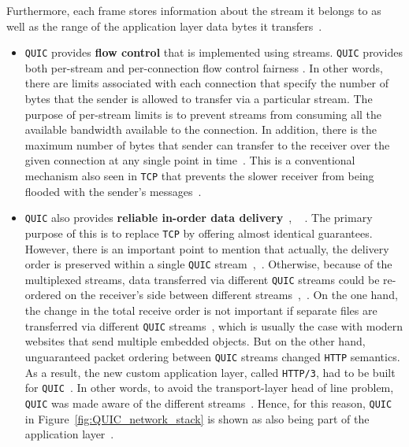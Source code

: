 \documentclass[12pt,a4paper]{report}
\begin{document}
  Furthermore, each frame stores information about the stream it belongs to as well as the range of the application layer data bytes it transfers~\cite{UnderstandQUIC}.
  \begin{itemize}
  
  
  \item \texttt{QUIC} provides \textbf{flow control} that is implemented using streams.
  \texttt{QUIC} provides both per-stream and per-connection flow control fairness \cite{ietf-quic-transport-draft-32}.
  In other words, there are limits associated with each connection that specify the number of bytes that the sender is allowed to transfer via a particular stream.
  The purpose of per-stream limits is to prevent streams from consuming all the available bandwidth available to the connection.
  In addition, there is the maximum number of bytes that sender can transfer to the receiver over the given connection at any single point in time~\cite{ietf-quic-transport-draft-32}.
  This is a conventional mechanism also seen in \texttt{TCP} that prevents the slower receiver from being flooded with the sender's messages~\cite{ietf-quic-transport-draft-32}.
  
  
    \item \texttt{QUIC} also provides \textbf{reliable in-order data delivery}~\cite[Section 7]{ietf-quic-transport-draft-32}, ~\cite{head-of-line-blocking-in-quic-and-http-3-the-details} .
    The primary purpose of this is to replace \texttt{TCP} by offering almost identical guarantees. 
    However, there is an important point to mention that actually, the delivery order is preserved within a single \texttt{QUIC} stream~\cite{head-of-line-blocking-in-quic-and-http-3-the-details},~\cite[Section 2]{ietf-quic-transport-draft-32}.
    Otherwise, because of the multiplexed streams, data transferred via different \texttt{QUIC} streams could be re-ordered on the receiver's side between different streams~\cite{head-of-line-blocking-in-quic-and-http-3-the-details},~\cite[Section 2]{ietf-quic-transport-draft-32}.
    On the one hand, the change in the total receive order is not important if separate files are transferred via different \texttt{QUIC} streams~\cite{head-of-line-blocking-in-quic-and-http-3-the-details}, which is usually the case with modern websites that send multiple embedded objects.
    But on the other hand, unguaranteed packet ordering between \texttt{QUIC} streams changed \texttt{HTTP} semantics.
    As a result, the new custom application layer, called \texttt{HTTP/3}, had to be built for \texttt{QUIC}~\cite{head-of-line-blocking-in-quic-and-http-3-the-details}.
    In other words, to avoid the transport-layer head of line problem, \texttt{QUIC} was made aware of the different streams~\cite{head-of-line-blocking-in-quic-and-http-3-the-details}.
    Hence, for this reason, \texttt{QUIC} in Figure~\ref{fig:QUIC_network_stack} is shown as also being part of the application layer~\cite{head-of-line-blocking-in-quic-and-http-3-the-details}.
    

\end{itemize}
\end{document}
